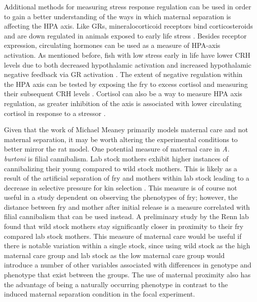 \documentclass[12pt,twoside]{reedthesis}
\begin{document}
Additional methods for measuring stress response regulation can be used in order
to gain a better understanding of the ways in which maternal separation is
affecting the HPA axis. Like GRs, mineralocorticoid receptors bind
corticosteroids and are
down regulated in animals exposed to early life stress \citep{gass_mice_2001, meaney_early_1996}.
Besides receptor expression, circulating hormones can be used
as a measure of HPA-axis activation. As mentioned
before, fish with low stress early in life have lower CRH levels due to both
decreased hypothalamic activation and increased hypothalamic negative feedback via
GR activation \citep{taborsky_stable_2012}. The extent of negative regulation
within the HPA axis can be tested by exposing the fry to excess cortisol and
measuring their subsequent CRH levels \citep{liu_maternal_2000}. Cortisol can also be a way to measure HPA
axis regulation, as greater inhibition of the axis is associated with lower
circulating cortisol in response to a stressor \citep{liu_maternal_2000}.

Given that the work of Michael Meaney primarily models maternal care and not
maternal separation, it may be worth altering the experimental conditions to
better mirror the rat model. One potential measure of maternal care in
\textit{A. burtoni} is filial cannibalism. Lab stock mothers exhibit higher
instances of cannibalizing their young compared to wild stock mothers. This is likely as
a result of the artificial separation of fry and mothers within lab stock
leading to a
decrease in selective pressure for kin selection \citep{renn_maternal_2009, lonstein_sensory_2002}. This measure is of course not useful
in a study dependent on observing the phenotypes of fry; however, the distance between fry and mother after initial
release is a measure correlated with filial cannibalism that can be used instead. A preliminary study by the
Renn lab found that wild stock mothers stay significantly closer in proximity to their
fry compared lab stock mothers. This measure of maternal care would be useful if
there is notable variation within a single stock, since using wild stock
as the high maternal care group and lab stock as the low maternal care group
would introduce a number of other variables associated with differences in genotype and phenotype that
exist between the groups. The use of maternal proximity also has the advantage of being a naturally
occurring phenotype in contrast to the induced maternal
separation condition in the focal experiment. 
\end{document}

